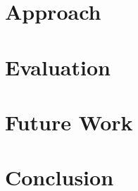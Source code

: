 \documentclass[a4paper]{IEEEtran}
\begin{document}
\section{Approach}
\label{sec:approach}


\section{Evaluation}
\label{sec:evaluation}


\section{Future Work}
\label{sec:future_work}


\section{Conclusion}
\label{sec:conclusion}




\end{document}

